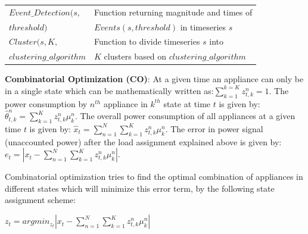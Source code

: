 \documentclass[conference]{IEEEtran}
\begin{document}
\begin{table}[ht!]
\begin{tabular}{|l|l|}
\hline
$Event\_Detection(s,$ & Function returning magnitude and times of \\[0.1cm]
$threshold)$                  &$Events(s,threshold)$ in timeseries $s$\\[0.1cm]
\hline
$Cluster(s,K,$& Function to divide timeseries $s$ into\\[0.1cm]
$clustering\_algorithm$&$K$ clusters based on $clustering\_algorithm$ \\
\hline

                             
                                                                               

\hline
%
\end{tabular}
\vspace{-8pt}
\end{table}

\noindent \textbf{Combinatorial Optimization (CO)}: At a given time an appliance can only be in a single state which can be mathematically written as:$\sum\limits_{k=1}^{k=K} z_{t,k}^n=1$. The power consumption by $n^{th}$ appliance in $k^{th}$ state at time $t$ is given by: $\hat{\theta}^n_{t,k}=\sum\limits_{k=1}^{K} z_{t,k}^n \mu_k^n$. The overall power consumption of all appliances at a given time $t$ is given by: $\hat{x}_{t}=\sum\limits_{n=1}^{N}\sum\limits_{k=1}^{K} z_{t,k}^n \mu_k^n$. The error in power signal (unaccounted power) after the load assignment explained above is given by: $e_t=|x_t-\sum\limits_{n=1}^{N}\sum\limits_{k=1}^{K}z_{t,k}^n\mu_k^n|$.

\noindent Combinatorial optimization tries to find the optimal combination of appliances in different states which will minimize this error term, by the following state assignment scheme:

$z_t=arg min_{z_t}|x_t-\sum\limits_{n=1}^{N}\sum\limits_{k=1}^{K}z_{t,k}^n\mu_k^n|$
\end{document}
